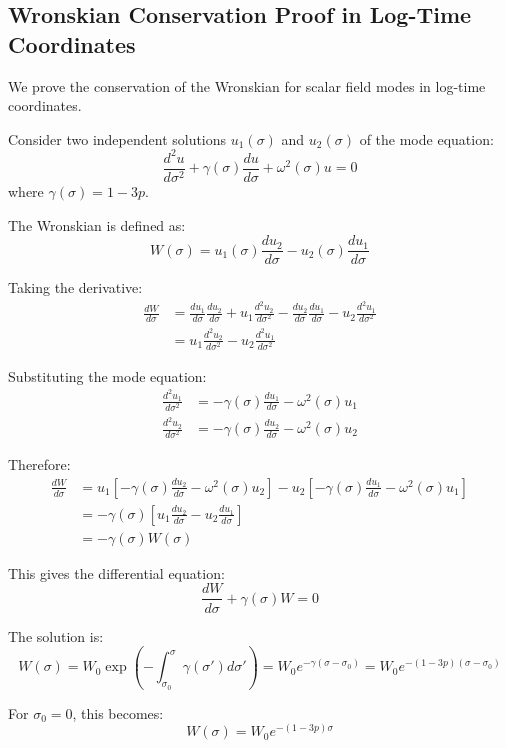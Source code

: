 \subsection{Wronskian Conservation Proof in Log-Time Coordinates}
\label{app:wronskian_proof}

We prove the conservation of the Wronskian for scalar field modes in log-time coordinates.

Consider two independent solutions $u_1(\sigma)$ and $u_2(\sigma)$ of the mode equation:
\begin{equation}
\frac{d^2 u}{d\sigma^2} + \gamma(\sigma) \frac{du}{d\sigma} + \omega^2(\sigma) u = 0
\end{equation}
where $\gamma(\sigma) = 1 - 3p$.

The Wronskian is defined as:
\begin{equation}
W(\sigma) = u_1(\sigma) \frac{du_2}{d\sigma} - u_2(\sigma) \frac{du_1}{d\sigma}
\end{equation}

Taking the derivative:
\begin{align}
\frac{dW}{d\sigma} &= \frac{du_1}{d\sigma} \frac{du_2}{d\sigma} + u_1 \frac{d^2u_2}{d\sigma^2} - \frac{du_2}{d\sigma} \frac{du_1}{d\sigma} - u_2 \frac{d^2u_1}{d\sigma^2} \\
&= u_1 \frac{d^2u_2}{d\sigma^2} - u_2 \frac{d^2u_1}{d\sigma^2}
\end{align}

Substituting the mode equation:
\begin{align}
\frac{d^2u_1}{d\sigma^2} &= -\gamma(\sigma) \frac{du_1}{d\sigma} - \omega^2(\sigma) u_1 \\
\frac{d^2u_2}{d\sigma^2} &= -\gamma(\sigma) \frac{du_2}{d\sigma} - \omega^2(\sigma) u_2
\end{align}

Therefore:
\begin{align}
\frac{dW}{d\sigma} &= u_1 \left[ -\gamma(\sigma) \frac{du_2}{d\sigma} - \omega^2(\sigma) u_2 \right] - u_2 \left[ -\gamma(\sigma) \frac{du_1}{d\sigma} - \omega^2(\sigma) u_1 \right] \\
&= -\gamma(\sigma) \left[ u_1 \frac{du_2}{d\sigma} - u_2 \frac{du_1}{d\sigma} \right] \\
&= -\gamma(\sigma) W(\sigma)
\end{align}

This gives the differential equation:
\begin{equation}
\frac{dW}{d\sigma} + \gamma(\sigma) W = 0
\end{equation}

The solution is:
\begin{equation}
W(\sigma) = W_0 \exp\left( -\int_{\sigma_0}^\sigma \gamma(\sigma') d\sigma' \right) = W_0 e^{-\gamma(\sigma-\sigma_0)} = W_0 e^{-(1-3p)(\sigma-\sigma_0)}
\end{equation}

For $\sigma_0 = 0$, this becomes:
\begin{equation}
W(\sigma) = W_0 e^{-(1-3p)\sigma}
\end{equation}